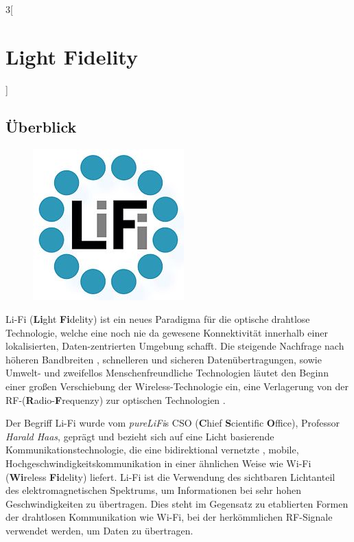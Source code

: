 \begin{multicols}{3}[\section{Light Fidelity}]
\subsection*{Überblick}
\begin{figure}
  \vspace{-20pt}
  \begin{center}
  	\hspace{-20pt}
    \includegraphics[width=0.7\linewidth]{Kapitel/lifi/Grafiken/LiFi_logo.jpg}
  \end{center}
  \vspace{-15pt}
\end{figure}
Li-Fi (\textbf{Li}ght \textbf{Fi}delity) ist ein neues Paradigma für die optische drahtlose Technologie, welche eine noch nie da gewesene Konnektivität innerhalb einer lokalisierten, Daten-zentrierten Umgebung schafft. Die steigende Nachfrage nach höheren Bandbreiten , schnelleren und sicheren Datenübertragungen, sowie Umwelt- und zweifellos  Menschenfreundliche Technologien läutet den Beginn einer großen Verschiebung der Wireless-Technologie ein, eine Verlagerung von der RF-(\textbf{R}adio-\textbf{F}requenzy) zur optischen Technologien .

Der Begriff Li-Fi wurde vom \textit{pureLiFi}s CSO (\textbf{C}hief \textbf{S}cientific \textbf{O}ffice), Professor \textit{Harald Haas}, geprägt und bezieht sich auf eine Licht basierende Kommunikationstechnologie, die eine bidirektional vernetzte , mobile, Hochgeschwindigkeitskommunikation in einer ähnlichen Weise wie Wi-Fi (\textbf{Wi}reless \textbf{Fi}delity) liefert.
Li-Fi ist die Verwendung des sichtbaren Lichtanteil des elektromagnetischen Spektrums, um Informationen bei sehr hohen Geschwindigkeiten zu übertragen. Dies steht im Gegensatz zu etablierten Formen der drahtlosen Kommunikation wie Wi-Fi, bei der herkömmlichen RF-Signale verwendet werden, um Daten zu übertragen.


\end{multicols}
